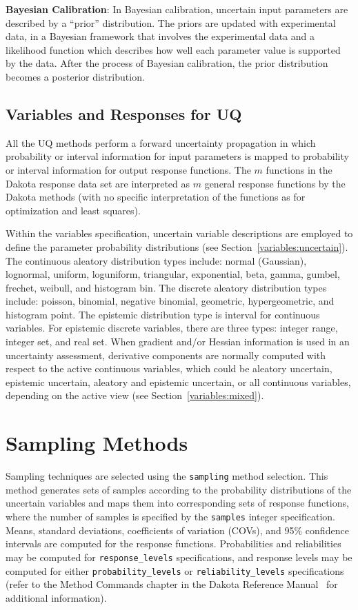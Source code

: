 \textbf{Bayesian Calibration}:  In Bayesian calibration, uncertain 
input parameters are described by a ``prior'' distribution. The priors
are updated with experimental data, in a Bayesian framework that 
involves the experimental data and a likelihood function which describes 
how well each parameter value is supported by the data. After the process
of Bayesian calibration, the prior distribution becomes a posterior 
distribution. 

\subsection{Variables and Responses for UQ}\label{uq:overview:varsresp}

All the UQ methods perform a forward uncertainty propagation in which
probability or interval information for input parameters is mapped to
probability or interval information for output response functions. The
$m$ functions in the Dakota response data set are interpreted as $m$
general response functions by the Dakota methods (with no specific
interpretation of the functions as for optimization and least
squares).

Within the variables specification, uncertain variable descriptions
are employed to define the parameter probability distributions (see
Section~\ref{variables:uncertain}). The continuous aleatory
distribution types include: normal (Gaussian), lognormal, uniform,
loguniform, triangular, exponential, beta, gamma, gumbel, frechet,
weibull, and histogram bin. The discrete aleatory distribution types
include: poisson, binomial, negative binomial, geometric,
hypergeometric, and histogram point. The epistemic distribution type
is interval for continuous variables. For epistemic discrete
variables, there are three types: integer range, integer set, and real
set.  When gradient and/or Hessian information is used in an
uncertainty assessment, derivative components are normally computed
with respect to the active continuous variables, which could be
aleatory uncertain, epistemic uncertain, aleatory and epistemic
uncertain, or all continuous variables, depending on the active view
(see Section~\ref{variables:mixed}).

\section{Sampling Methods}\label{uq:sampling}

Sampling techniques are selected using the \texttt{sampling}
method selection. This method generates sets of samples according to
the probability distributions of the uncertain variables and maps them
into corresponding sets of response functions, where the number of
samples is specified by the \texttt{samples} integer specification.
Means, standard deviations, coefficients of variation (COVs), and 95\%
confidence intervals are computed for the response functions.
Probabilities and reliabilities may be computed for 
\texttt{response\_levels} specifications, and response levels may be
computed for either \texttt{probability\_levels} or
\texttt{reliability\_levels} specifications (refer to the Method
Commands chapter in the Dakota Reference Manual~\cite{RefMan} for
additional information).

